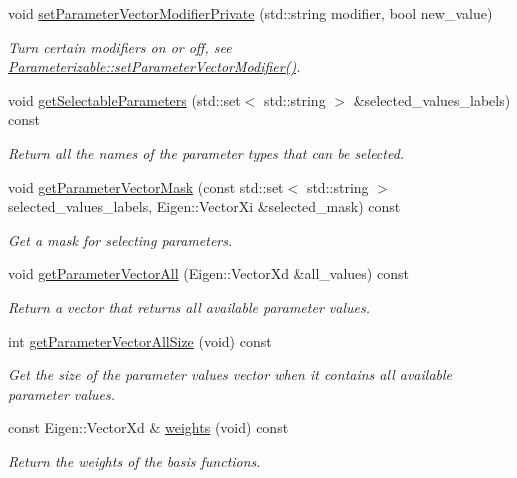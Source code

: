 \begin{DoxyCompactItemize}
void \hyperlink{classDmpBbo_1_1ModelParametersRBFN_add0186ca30d91928b887805fe0d24598}{set\+Parameter\+Vector\+Modifier\+Private} (std\+::string modifier, bool new\+\_\+value)
\begin{DoxyCompactList}\small\item\em Turn certain modifiers on or off, see \hyperlink{classDmpBbo_1_1Parameterizable_a6eefba9dfdcfe8878c10150074c6a68e}{Parameterizable\+::set\+Parameter\+Vector\+Modifier()}. \end{DoxyCompactList}\item 
void \hyperlink{classDmpBbo_1_1ModelParametersRBFN_a887f4747734bd8b7cc4f799092ff31b4}{get\+Selectable\+Parameters} (std\+::set$<$ std\+::string $>$ \&selected\+\_\+values\+\_\+labels) const 
\begin{DoxyCompactList}\small\item\em Return all the names of the parameter types that can be selected. \end{DoxyCompactList}\item 
void \hyperlink{classDmpBbo_1_1ModelParametersRBFN_a9dba1f93e426e7511630ec1ece4ace17}{get\+Parameter\+Vector\+Mask} (const std\+::set$<$ std\+::string $>$ selected\+\_\+values\+\_\+labels, Eigen\+::\+Vector\+Xi \&selected\+\_\+mask) const 
\begin{DoxyCompactList}\small\item\em Get a mask for selecting parameters. \end{DoxyCompactList}\item 
void \hyperlink{classDmpBbo_1_1ModelParametersRBFN_a29429ff2771d1e56cfba7250d38da4b1}{get\+Parameter\+Vector\+All} (Eigen\+::\+Vector\+Xd \&all\+\_\+values) const 
\begin{DoxyCompactList}\small\item\em Return a vector that returns all available parameter values. \end{DoxyCompactList}\item 
int \hyperlink{classDmpBbo_1_1ModelParametersRBFN_ab24d2485b3b795b516f4844f225100eb}{get\+Parameter\+Vector\+All\+Size} (void) const 
\begin{DoxyCompactList}\small\item\em Get the size of the parameter values vector when it contains all available parameter values. \end{DoxyCompactList}\item 
const Eigen\+::\+Vector\+Xd \& \hyperlink{classDmpBbo_1_1ModelParametersRBFN_ab0065893578a0770652450ebfe930481}{weights} (void) const 
\begin{DoxyCompactList}\small\item\em Return the weights of the basis functions. \end{DoxyCompactList}\item 

\end{DoxyCompactItemize}
